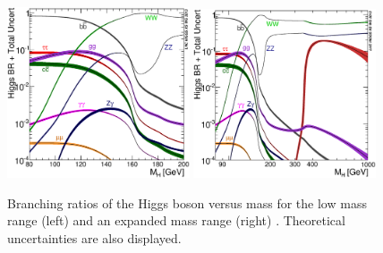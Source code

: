 \begin{figure}
	\includegraphics[width=0.48\textwidth]{tex/motivation/BR_lowrange}
	\hfill
	\includegraphics[width=0.48\textwidth]{tex/motivation/BR_fullrange}
	\caption{Branching ratios of the Higgs boson versus mass for the low mass range (left) and an expanded mass range (right) \cite{YR3}. Theoretical uncertainties are also displayed.}
	\label{fig:higgs_br}
\end{figure}
